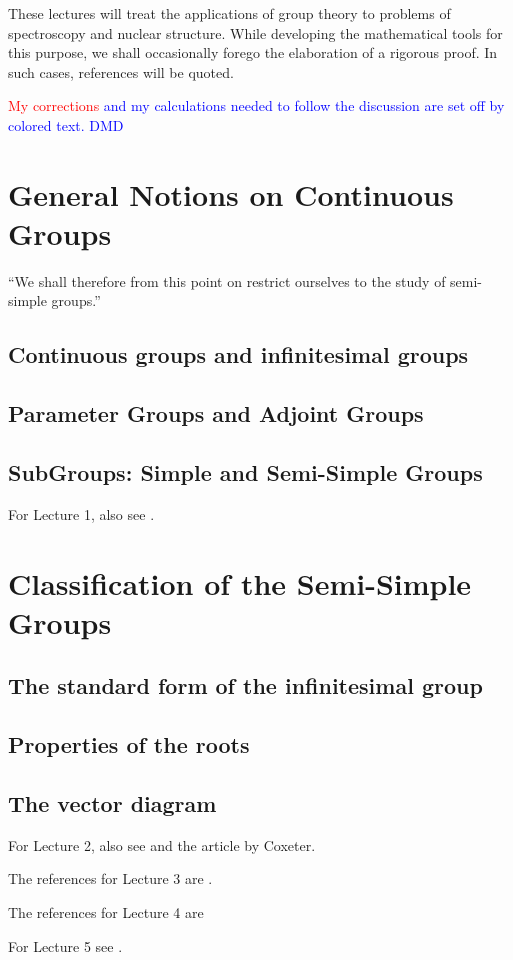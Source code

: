 \documentclass[a4paper,12pt]{article}
\begin{document}
These lectures will treat the applications of group theory to problems of
spectroscopy and nuclear structure. While developing the mathematical tools for
this purpose, we shall occasionally forego the elaboration of a rigorous proof.
In such cases, references will be quoted.

\textcolor{red}{My corrections} \textcolor{blue}{and my calculations needed to
follow the discussion are set off by colored text. DMD}

\section{General Notions on Continuous Groups}
``We shall therefore from this point on restrict ourselves to the study of semi-simple groups.'' 
\subsection{Continuous groups and infinitesimal groups}

\subsection{Parameter Groups and Adjoint Groups}

\subsection{SubGroups: Simple and Semi-Simple Groups}


For Lecture 1, also see \cite{Bianchi1903, Eisenhart1933, Weyl1934}.

\section{Classification of the Semi-Simple Groups}

\subsection{The standard form of the infinitesimal group}

\subsection{Properties of the roots}
\subsection{The vector diagram}


For Lecture 2, also see \cite{Weyl1926a,Weyl1926b, vanderWaerden1933, Coxeter1973}
and the article \cite[p.~186]{Weyl1934} by Coxeter.

The references for Lecture 3 are \cite{Cartan1913, Casimir1931, Casimir1935, Weyl1939, Racah1950a}.

The references for Lecture 4 are 
\cite{Condon1935, Weyl:1950:GTQ, Eckart1930, Wigner1931, vanderWaerden1974, Racah1942a, Racah1942b, Racah1943, Racah1949a, Wigner1941, Racah1949b, Jahn1950}

For Lecture 5 see \cite{Racah1950b}.
%
\printbibliography[heading=bibintoc,title={References}]
\end{document}
